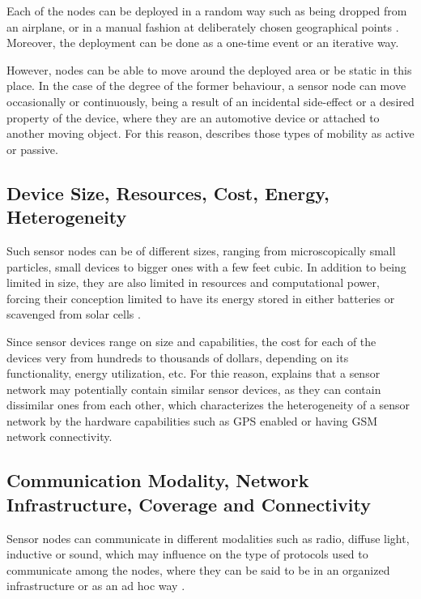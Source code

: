 Each of the nodes can be deployed in a random way such as being dropped
from an airplane, or in a manual fashion at deliberately chosen geographical 
points \cite{snintro01}. Moreover, the deployment can be done as a one-time
event or an iterative way. 

However, nodes can be able to move around the deployed area or be static in
this place. In the case of the degree of the former behaviour, a sensor node
can move occasionally or continuously, being a result of an incidental 
side-effect or a desired property of the device, where they are an automotive
device or attached to another moving object. For this reason, \cite{snintro01} 
describes those types of mobility as active or passive.

\subsection{Device Size, Resources, Cost, Energy, Heterogeneity}

Such sensor nodes can be of different sizes, ranging from microscopically small
particles, small devices to bigger ones with a few feet cubic. In addition to
being limited in size, they are also limited in resources and computational
power, forcing their conception limited to have its energy stored in either
batteries or scavenged from solar cells \cite{snintro01}.

Since sensor devices range on size and capabilities, the cost for each of the
devices very from hundreds to thousands of dollars, depending on its
functionality, energy utilization, etc. For thie reason, \cite{snintro01}
explains that a sensor network may potentially contain similar sensor devices,
as they can contain dissimilar ones from each other, which characterizes the heterogeneity 
of a sensor network by the hardware capabilities such as GPS enabled or having
GSM  network connectivity.

\subsection{Communication Modality, Network Infrastructure, Coverage and
Connectivity}
\label{sec:sn-infrastructure}

Sensor nodes can communicate in different modalities such as radio, diffuse
light, inductive or sound, which may influence on the type of protocols used to
communicate among the nodes, where they can be said to be in an organized
infrastructure or as an ad hoc way \cite{snintro01}.

